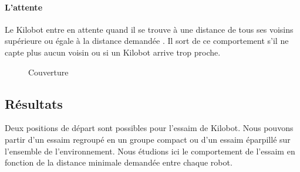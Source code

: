 \documentclass[a4paper]{article}
\begin{document}
\paragraph{L'attente} Le Kilobot entre en attente quand il se trouve à une distance de tous ses voisins supérieure ou égale à la distance demandée . Il sort de ce comportement s'il ne capte plus aucun voisin ou si un Kilobot arrive trop proche.\\


\begin{figure}[h!]
\centering
{}
\caption{Couverture}
\end{figure}
\newpage
\subsection{Résultats}
Deux positions de départ sont possibles pour l'essaim de Kilobot. Nous pouvons partir d'un essaim regroupé en un groupe compact ou d'un essaim éparpillé sur l'ensemble de l'environnement.
Nous étudions ici le comportement de l'essaim en fonction de la distance minimale demandée entre chaque robot.
\end{document}
